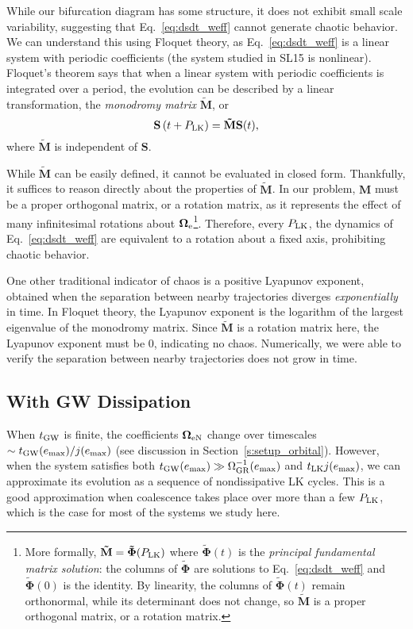 \documentclass[
        twocolumn,
        twocolappendix
    ]{aastex63}
\renewcommand*{\bm}[1]{\boldsymbol{\mathbf{#1}}}
\newcommand*{\p}[1]{\left(#1\right)}
\begin{document}
While our bifurcation diagram has some structure, it does not exhibit small
scale variability, suggesting that Eq.~\eqref{eq:dsdt_weff} cannot generate
chaotic behavior. We can understand this using Floquet theory, as
Eq.~\eqref{eq:dsdt_weff} is a linear system with periodic coefficients (the
system studied in SL15 is nonlinear). Floquet's theorem says that when a linear
system with periodic coefficients is integrated over a period, the evolution can
be described by a linear transformation, the \emph{monodromy matrix}
$\bm{\tilde{M}}$, or
\begin{equation}
    \bm{S}\p{t + P_{\rm LK}} = \bm{\tilde{M}} \bm{S}(t),
\end{equation}
where $\bm{\tilde{M}}$ is independent of $\bm{S}$.

While $\bm{\tilde{M}}$ can be easily defined, it cannot be evaluated in
closed form. Thankfully, it suffices to reason directly about the properties of
$\bm{\tilde{M}}$. In our problem, $\bm{M}$ must be a proper orthogonal matrix,
or a rotation matrix, as it represents the effect of many infinitesimal
rotations about $\bm{\Omega}_{\rm e}$\footnote{More formally, $\bm{\tilde{M}} =
\bm{\tilde{\Phi}}(P_{\rm LK})$ where $\bm{\tilde{\Phi}}(t)$ is the
\emph{principal fundamental matrix solution}: the columns of $\bm{\tilde{\Phi}}$
are solutions to Eq.~\eqref{eq:dsdt_weff} and $\bm{\tilde{\Phi}}(0)$ is the
identity. By linearity, the columns of $\bm{\tilde{\Phi}}(t)$ remain
orthonormal, while its determinant does not change, so $\bm{\tilde{M}}$ is a
proper orthogonal matrix, or a rotation matrix.}. Therefore, every $P_{\rm LK}$,
the dynamics of Eq.~\eqref{eq:dsdt_weff} are equivalent to a rotation about a
fixed axis, prohibiting chaotic behavior.

One other traditional indicator of chaos is a positive Lyapunov exponent,
obtained when the separation between nearby trajectories diverges
\emph{exponentially} in time. In Floquet theory, the Lyapunov exponent is the
logarithm of the largest eigenvalue of the monodromy matrix. Since
$\bm{\tilde{M}}$ is a rotation matrix here, the Lyapunov exponent must be $0$,
indicating no chaos. Numerically, we were able to verify the separation between
nearby trajectories does not grow in time.

\subsection{With GW Dissipation}

When $t_{\rm GW}$ is finite, the coefficients $\bm{\Omega}_{\rm eN}$ change over
timescales $\sim t_{\rm GW}(e_{\max}) / j(e_{\max})$ (see discussion in
Section~\ref{s:setup_orbital}). However, when the system satisfies both $t_{\rm
GW}(e_{\max}) \gg \Omega_{\rm GR}^{-1}(e_{\max})$ and $t_{\rm LK} j(e_{\max})$,
we can approximate its evolution as a sequence of nondissipative LK cycles. This
is a good approximation when coalescence takes place over more than a few
$P_{\rm LK}$, which is the case for most of the systems we study here.
\end{document}
